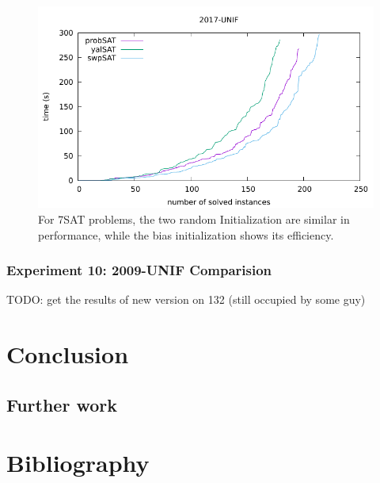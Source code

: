 \documentclass[12pt,a4paper,twoside]{scrartcl}
\numberwithin{equation}{section}
\begin{document}
  \begin{figure}[H]
\begin{center}
  \includegraphics[scale = 1]{DATA/UNIF/e5.pdf}
  \end{center}
  \caption{For 7SAT problems, the two random Initialization are similar in performance, while the bias initialization shows its efficiency.}
  \label{Experiment 9 all cactus plot}
  \end{figure} 
\subsubsection{Experiment 10: 2009-UNIF Comparision} 
\label{sec:Experiment 10}

TODO: get the results of new version on 132 (still occupied by some guy)

  
\section{Conclusion}
\label{sec:conc}
\subsection{Further work}
\section{Bibliography}


\end{document}
